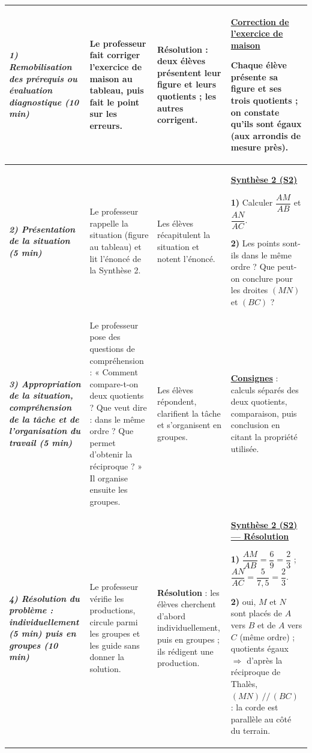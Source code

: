 \documentclass[10pt]{article}
\newcommand{\titreR}[1]{\underline{\textcolor{rougetitre}{\bfseries #1}}}
\newcommand{\seance}[1]{\fcolorbox{bleuseance}{bleufond}{\textcolor{bleuseance}{\bfseries #1}}}
\newcommand{\moment}[1]{\textbf{\itshape #1}}
\newcommand{\mclef}[1]{\colorbox{jaunesurl}{#1}}
\begin{document}
\begin{longtable}{|p{2.35cm}|p{5.35cm}|p{4.55cm}|p{13.85cm}|}
\hline
\seance{SEANCE 2} \newline \moment{1) Remobilisation des prérequis ou évaluation diagnostique (10 min)} &
Le professeur fait corriger l'exercice de maison au tableau, puis fait le point sur les erreurs. &
\textbf{Résolution} : deux élèves présentent leur figure et leurs quotients ; les
autres corrigent. &
\titreR{Correction de l'exercice de maison} \par
Chaque élève présente sa figure et ses trois quotients ; on constate qu'ils sont
égaux (aux arrondis de mesure près). \\ \hline

\moment{2) Présentation de la situation (5 min)} &
Le professeur rappelle la situation  (figure au tableau) et lit l'énoncé de la Synthèse 2. &
Les élèves récapitulent la situation et notent l'énoncé. &
\titreR{Synthèse 2 (S2)} \par
\textbf{1)} Calculer $\dfrac{AM}{AB}$ et $\dfrac{AN}{AC}$. \par
\textbf{2)} Les points sont-ils dans le même ordre ? Que peut-on conclure pour les
droites $(MN)$ et $(BC)$ ? \\ \hline

\moment{3) Appropriation de la situation, compréhension de la tâche et de
l'organisation du travail (5 min)} &
Le professeur pose des questions de compréhension : « Comment compare-t-on deux quotients ? Que veut dire : dans le même ordre ? Que permet d'obtenir la réciproque ? » Il organise ensuite les groupes. &
Les élèves répondent, clarifient la tâche et s'organisent en groupes. &
\titreR{Consignes} : calculs séparés des deux quotients, comparaison, puis
conclusion en citant la propriété utilisée. \\ \hline

\moment{4) Résolution du problème : individuellement (5 min) puis en groupes (10 min)} &
Le professeur vérifie les productions, circule parmi les groupes et les guide sans donner la solution. &
\textbf{Résolution} : les élèves cherchent d'abord individuellement, puis en groupes ; ils rédigent une production. &
\titreR{Synthèse 2 (S2) — Résolution} \par
\textbf{1)} $\dfrac{AM}{AB}=\dfrac{6}{9}=\dfrac{2}{3}$ ; \;
$\dfrac{AN}{AC}=\dfrac{5}{7{,}5}=\dfrac{2}{3}$. \par
\textbf{2)} oui, $M$ et $N$ sont placés de $A$ vers $B$ et de $A$ vers $C$ (même
ordre) ; quotients égaux $\Rightarrow$ d'après la \mclef{réciproque de Thalès},
$(MN)\,//\,(BC)$ : la corde est parallèle au côté du terrain. \\ \hline


\end{longtable}
\end{document}
